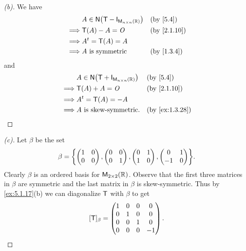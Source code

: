 \begin{proof}[(b)]
	We have
	\begin{align*}
		         & A \in \ns{\T - \IT[\ms[n][n][\R]]} &  & \by{5.4}    \\
		\implies & \T(A) - A = \zm                    &  & \by{2.1.10} \\
		\implies & \tp{A} = \T(A) = A                                  \\
		\implies & A \text{ is symmetric}             &  & \by{1.3.4}
	\end{align*}
	and
	\begin{align*}
		         & A \in \ns{\T + \IT[\ms[n][n][\R]]} &  & \by{5.4}       \\
		\implies & \T(A) + A = \zm                    &  & \by{2.1.10}    \\
		\implies & \tp{A} = \T(A) = -A                                    \\
		\implies & A \text{ is skew-symmetric}.       &  & \by{ex:1.3.28}
	\end{align*}
\end{proof}

\begin{proof}[(c)]
	Let \(\beta\) be the set
	\[
		\beta = \set{\begin{pmatrix}
				1 & 0 \\
				0 & 0
			\end{pmatrix}, \begin{pmatrix}
				0 & 0 \\
				0 & 1
			\end{pmatrix}, \begin{pmatrix}
				0 & 1 \\
				1 & 0
			\end{pmatrix}, \begin{pmatrix}
				0  & 1 \\
				-1 & 0
			\end{pmatrix}}.
	\]
	Clearly \(\beta\) is an ordered basis for \(\ms[2][2][\R]\).
	Observe that the first three matrices in \(\beta\) are symmetric and the last matrix in \(\beta\) is skew-symmetric.
	Thus by \cref{ex:5.1.17}(b) we can diagonalize \(\mathsf{T}\) with \(\beta\) to get
	\[
		[\mathsf{T}]_{\beta} = \begin{pmatrix}
			1 & 0 & 0 & 0  \\
			0 & 1 & 0 & 0  \\
			0 & 0 & 1 & 0  \\
			0 & 0 & 0 & -1
		\end{pmatrix}.
	\]
\end{proof}

